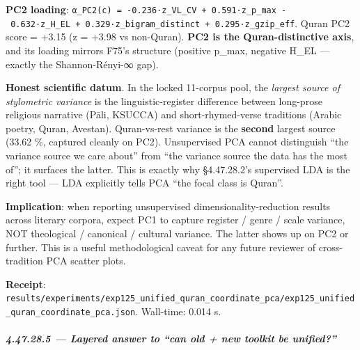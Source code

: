 \documentclass[
]{article}
\begin{document}
\textbf{PC2 loading}:
\texttt{α\_PC2(c)\ =\ -0.236·z\_VL\_CV\ +\ 0.591·z\_p\_max\ -\ 0.632·z\_H\_EL\ +\ 0.329·z\_bigram\_distinct\ +\ 0.295·z\_gzip\_eff}.
Quran PC2 score = +3.15 (z = +3.98 vs non-Quran). \textbf{PC2 is the
Quran-distinctive axis}, and its loading mirrors F75's structure
(positive p\_max, negative H\_EL --- exactly the Shannon-Rényi-∞ gap).

\textbf{Honest scientific datum}. In the locked 11-corpus pool, the
\emph{largest source of stylometric variance} is the linguistic-register
difference between long-prose religious narrative (Pāli, KSUCCA) and
short-rhymed-verse traditions (Arabic poetry, Quran, Avestan).
Quran-vs-rest variance is the \textbf{second} largest source (33.62 \%,
captured cleanly on PC2). Unsupervised PCA cannot distinguish ``the
variance source we care about'' from ``the variance source the data has
the most of''; it surfaces the latter. This is exactly why §4.47.28.2's
supervised LDA is the right tool --- LDA explicitly tells PCA ``the
focal class is Quran''.

\textbf{Implication}: when reporting unsupervised
dimensionality-reduction results across literary corpora, expect PC1 to
capture register / genre / scale variance, NOT theological / canonical /
cultural variance. The latter shows up on PC2 or further. This is a
useful methodological caveat for any future reviewer of cross-tradition
PCA scatter plots.

\textbf{Receipt}:
\texttt{results/experiments/exp125\_unified\_quran\_coordinate\_pca/exp125\_unified\_quran\_coordinate\_pca.json}.
Wall-time: 0.014 s.

\subparagraph{4.47.28.5 --- Layered answer to ``can old + new toolkit be
unified?''}\label{layered-answer-to-can-old-new-toolkit-be-unified}
\end{document}
